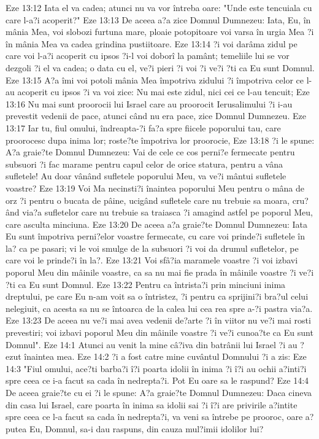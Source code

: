 Eze 13:12  Iata el va cadea; atunci nu va vor întreba oare: "Unde este tencuiala cu care l-a?i acoperit?"
Eze 13:13  De aceea a?a zice Domnul Dumnezeu: Iata, Eu, în mânia Mea, voi slobozi furtuna mare, ploaie potopitoare voi varsa în urgia Mea ?i în mânia Mea va cadea grindina pustiitoare.
Eze 13:14  ?i voi darâma zidul pe care voi l-a?i acoperit cu ipsos ?i-l voi doborî la pamânt; temeliile lui se vor dezgoli ?i el va cadea; o data cu el, ve?i pieri ?i voi ?i ve?i ?ti ca Eu sunt Domnul.
Eze 13:15  A?a îmi voi potoli mânia Mea împotriva zidului ?i împotriva celor ce l-au acoperit cu ipsos ?i va voi zice: Nu mai este zidul, nici cei ce l-au tencuit;
Eze 13:16  Nu mai sunt proorocii lui Israel care au proorocit Ierusalimului ?i i-au prevestit vedenii de pace, atunci când nu era pace, zice Domnul Dumnezeu.
Eze 13:17  Iar tu, fiul omului, îndreapta-?i fa?a spre fiicele poporului tau, care proorocesc dupa inima lor; roste?te împotriva lor proorocie,
Eze 13:18  ?i le spune: A?a graie?te Domnul Dumnezeu: Vai de cele ce cos perni?e fermecate pentru subsuori ?i fac marame pentru capul celor de orice statura, pentru a vâna sufletele! Au doar vânând sufletele poporului Meu, va ve?i mântui sufletele voastre?
Eze 13:19  Voi Ma necinsti?i înaintea poporului Meu pentru o mâna de orz ?i pentru o bucata de pâine, ucigând sufletele care nu trebuie sa moara, cru?ând via?a sufletelor care nu trebuie sa traiasca ?i amagind astfel pe poporul Meu, care asculta minciuna.
Eze 13:20  De aceea a?a graie?te Domnul Dumnezeu: Iata Eu sunt împotriva perni?elor voastre fermecate, cu care voi prinde?i sufletele în la? ca pe pasari; vi le voi smulge de la subsuori ?i voi da drumul sufletelor, pe care voi le prinde?i în la?.
Eze 13:21  Voi sfâ?ia maramele voastre ?i voi izbavi poporul Meu din mâinile voastre, ca sa nu mai fie prada în mâinile voastre ?i ve?i ?ti ca Eu sunt Domnul.
Eze 13:22  Pentru ca întrista?i prin minciuni inima dreptului, pe care Eu n-am voit sa o întristez, ?i pentru ca sprijini?i bra?ul celui nelegiuit, ca acesta sa nu se întoarca de la calea lui cea rea spre a-?i pastra via?a.
Eze 13:23  De aceea nu ve?i mai avea vedenii de?arte ?i în viitor nu ve?i mai rosti prevestiri; voi izbavi poporul Meu din mâinile voastre ?i ve?i cunoa?te ca Eu sunt Domnul".
Eze 14:1  Atunci au venit la mine câ?iva din batrânii lui Israel ?i au ?ezut înaintea mea.
Eze 14:2  ?i a fost catre mine cuvântul Domnului ?i a zis:
Eze 14:3  "Fiul omului, ace?ti barba?i î?i poarta idolii în inima ?i î?i au ochii a?inti?i spre ceea ce i-a facut sa cada în nedrepta?i. Pot Eu oare sa le raspund?
Eze 14:4  De aceea graie?te cu ei ?i le spune: A?a graie?te Domnul Dumnezeu: Daca cineva din casa lui Israel, care poarta în inima sa idolii sai ?i î?i are privirile a?intite spre ceea ce l-a facut sa cada în nedrepta?i, va veni sa întrebe pe prooroc, oare a? putea Eu, Domnul, sa-i dau raspuns, din cauza mul?imii idolilor lui?
